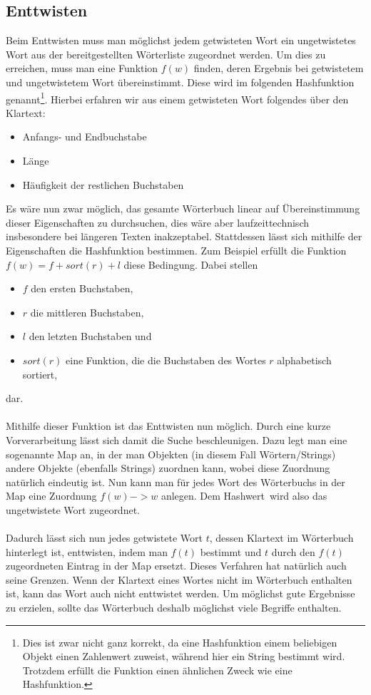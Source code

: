 \documentclass[a4paper, notitlepage, 12pt]{scrartcl}
\begin{document}
\subsection{Enttwisten}
Beim Enttwisten muss man möglichst jedem getwisteten Wort ein ungetwistetes Wort aus der bereitgestellten Wörterliste zugeordnet werden. Um dies zu erreichen, muss man eine Funktion $f(w)$ finden, deren Ergebnis bei getwistetem und ungetwistetem Wort übereinstimmt. Diese wird im folgenden Hashfunktion genannt\footnote{Dies ist zwar nicht ganz korrekt, da eine Hashfunktion einem beliebigen Objekt einen Zahlenwert zuweist, während hier ein String bestimmt wird. Trotzdem erfüllt die Funktion einen ähnlichen Zweck wie eine Hashfunktion.}. Hierbei erfahren wir aus einem getwisteten Wort folgendes über den Klartext:
\begin{itemize}
	\item Anfangs- und Endbuchstabe
	\item Länge
	\item Häufigkeit der restlichen Buchstaben
\end{itemize}
Es wäre nun zwar möglich, das gesamte Wörterbuch linear auf Übereinstimmung dieser Eigenschaften zu durchsuchen, dies wäre aber laufzeittechnisch insbesondere bei längeren Texten inakzeptabel. Stattdessen lässt sich mithilfe der Eigenschaften die Hashfunktion bestimmen. Zum Beispiel erfüllt die Funktion $f(w) = f + sort(r) + l$ diese Bedingung. Dabei stellen 
\begin{itemize}
	\item $f$ den ersten Buchstaben,
	\item $r$ die mittleren Buchstaben,
	\item $l$ den letzten Buchstaben und
	\item $sort(r)$ eine Funktion, die die Buchstaben des Wortes $r$ alphabetisch sortiert,
\end{itemize}
dar. \\ \\
Mithilfe dieser Funktion ist das Enttwisten nun möglich. Durch eine kurze Vorverarbeitung lässt sich damit die Suche beschleunigen. Dazu legt man eine sogenannte Map an, in der man Objekten (in diesem Fall Wörtern/Strings) andere Objekte (ebenfalls Strings) zuordnen kann, wobei diese Zuordnung natürlich eindeutig ist. Nun kann man für jedes Wort des Wörterbuchs in der Map eine Zuordnung $f(w) -> w$ anlegen. Dem \glqq Hashwert\grqq ~wird also das ungetwistete Wort zugeordnet. \\ \\
Dadurch lässt sich nun jedes getwistete Wort $t$, dessen Klartext im Wörterbuch hinterlegt ist, enttwisten, indem man $f(t)$ bestimmt und $t$ durch den $f(t)$ zugeordneten Eintrag in der Map ersetzt. Dieses Verfahren hat natürlich auch seine Grenzen. Wenn der Klartext eines Wortes nicht im Wörterbuch enthalten ist, kann das Wort auch nicht enttwistet werden. Um möglichst gute Ergebnisse zu erzielen, sollte das Wörterbuch deshalb möglichst viele Begriffe enthalten.
\end{document}

